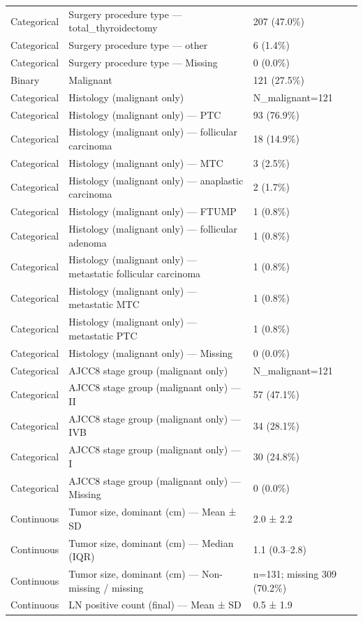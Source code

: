 \begin{table}[htbp]
\begin{tabular}{lll}
Categorical & Surgery procedure type — total\_thyroidectomy & 207 (47.0\%) \\
Categorical & Surgery procedure type — other & 6 (1.4\%) \\
Categorical & Surgery procedure type — Missing & 0 (0.0\%) \\
Binary & Malignant & 121 (27.5\%) \\
Categorical & Histology (malignant only) & N\_malignant=121 \\
Categorical & Histology (malignant only) — PTC & 93 (76.9\%) \\
Categorical & Histology (malignant only) — follicular carcinoma & 18 (14.9\%) \\
Categorical & Histology (malignant only) — MTC & 3 (2.5\%) \\
Categorical & Histology (malignant only) — anaplastic carcinoma & 2 (1.7\%) \\
Categorical & Histology (malignant only) — FTUMP & 1 (0.8\%) \\
Categorical & Histology (malignant only) — follicular adenoma & 1 (0.8\%) \\
Categorical & Histology (malignant only) — metastatic follicular carcinoma & 1 (0.8\%) \\
Categorical & Histology (malignant only) — metastatic MTC & 1 (0.8\%) \\
Categorical & Histology (malignant only) — metastatic PTC & 1 (0.8\%) \\
Categorical & Histology (malignant only) — Missing & 0 (0.0\%) \\
Categorical & AJCC8 stage group (malignant only) & N\_malignant=121 \\
Categorical & AJCC8 stage group (malignant only) — II & 57 (47.1\%) \\
Categorical & AJCC8 stage group (malignant only) — IVB & 34 (28.1\%) \\
Categorical & AJCC8 stage group (malignant only) — I & 30 (24.8\%) \\
Categorical & AJCC8 stage group (malignant only) — Missing & 0 (0.0\%) \\
Continuous & Tumor size, dominant (cm) — Mean ± SD & 2.0 ± 2.2 \\
Continuous & Tumor size, dominant (cm) — Median (IQR) & 1.1 (0.3–2.8) \\
Continuous & Tumor size, dominant (cm) — Non-missing / missing & n=131; missing 309 (70.2\%) \\
Continuous & LN positive count (final) — Mean ± SD & 0.5 ± 1.9 \\

\end{tabular}
\end{table}
